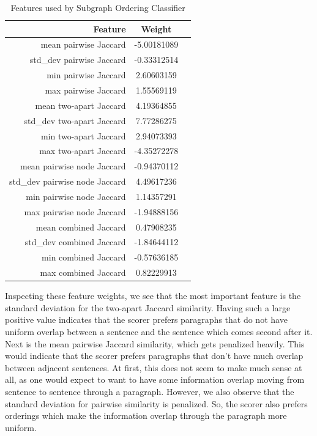 \documentclass[12pt]{article}
\begin{document}
\begin{table}
\centering
\begin{tabular}{|r|c|c|}
\hline
Feature & Weight \\ \hline\hline
mean pairwise Jaccard & -5.00181089 \\ \hline
std\_dev pairwise Jaccard & -0.33312514 \\ \hline
min pairwise Jaccard & 2.60603159 \\ \hline
max pairwise Jaccard & 1.55569119 \\ \hline
mean two-apart Jaccard & 4.19364855 \\ \hline
std\_dev two-apart Jaccard & 7.77286275 \\ \hline
min two-apart Jaccard & 2.94073393 \\ \hline
max two-apart Jaccard & -4.35272278 \\ \hline
mean pairwise node Jaccard & -0.94370112 \\ \hline
std\_dev pairwise node Jaccard & 4.49617236 \\ \hline
min pairwise node Jaccard & 1.14357291 \\ \hline
max pairwise node Jaccard & -1.94888156 \\ \hline
mean combined Jaccard & 0.47908235 \\ \hline
std\_dev combined Jaccard & -1.84644112 \\ \hline
min combined Jaccard & -0.57636185 \\ \hline
max combined Jaccard & 0.82229913 \\ \hline
\end{tabular}
\caption{Features used by Subgraph Ordering Classifier}
\end{table}

Inspecting these feature weights, we see that the most important feature is the
standard deviation for the two-apart Jaccard similarity. Having such a large
positive value indicates that the scorer prefers paragraphs that do not have
uniform overlap between a sentence and the sentence which comes second after
it. Next is the mean pairwise Jaccard similarity, which gets penalized heavily.
This would indicate that the scorer prefers paragraphs that don't have much
overlap between adjacent sentences. At first, this does not seem to make much
sense at all, as one would expect to want to have some information overlap
moving from sentence to sentence through a paragraph. However, we also observe
that the standard deviation for pairwise similarity is penalized. So, the
scorer also prefers orderings which make the information overlap through the
paragraph more uniform.
\end{document}
